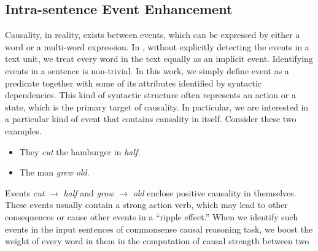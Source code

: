 
\subsection{Intra-sentence Event Enhancement}
\label{sec:eventBoost}
Causality, in reality, exists between events, which can be
expressed by either a word or a multi-word expression.
In , without
explicitly detecting the events in a text unit, we treat every word
in the text equally as an implicit event. Identifying events in
a sentence is non-trivial. In this work,
we simply define event as a predicate together with some of its attributes
identified by syntactic dependencies. This kind of
syntactic structure often represents an action or a state, which
is the primary target of causality.
%
%
In particular, we are interested in a particular kind of event
that contains causality in itself.
Consider these two examples.
\begin{itemize}
\item They \emph{cut} the hamburger in \emph{half}.
\item The man \emph{grew} \emph{old}.
\end{itemize}
Events \emph{cut} $\rightarrow$ \emph{half} and \emph{grow}
$\rightarrow$ \emph{old} enclose positive causality in themselves.
These events usually contain a strong action verb,
which may lead to other consequences or cause other events in a
``ripple effect.''
When we identify such events in the input sentences of
commonsense causal reasoning task, we boost the weight
of every word in them in the computation of causal strength between two
